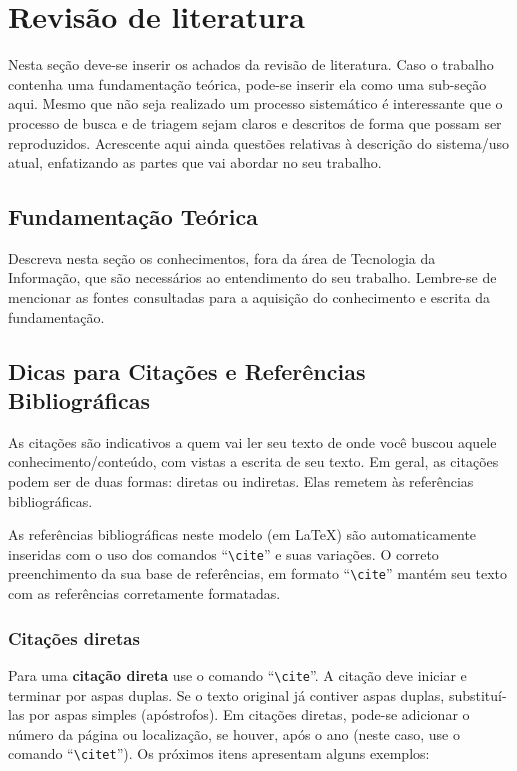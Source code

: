 \chapter{Revisão de literatura}\label{chap:revisao}

Nesta seção deve-se inserir os achados da revisão de literatura. Caso o trabalho contenha uma fundamentação teórica, pode-se inserir ela como uma sub-seção aqui. Mesmo que não seja realizado um processo sistemático é interessante que o processo de busca e de triagem sejam claros e descritos de forma que possam ser reproduzidos.  Acrescente aqui ainda questões relativas à descrição do sistema/uso atual, enfatizando as partes que vai abordar no seu trabalho.

\section{Fundamentação Teórica}

Descreva nesta seção os conhecimentos, fora da área de Tecnologia da Informação, que são necessários ao entendimento do seu trabalho. Lembre-se de mencionar as fontes consultadas para a aquisição do conhecimento e escrita da fundamentação.


\section{Dicas para Citações e Referências Bibliográficas}


As citações são indicativos a quem vai ler seu texto de onde você buscou aquele conhecimento/conteúdo, com vistas a escrita de seu texto. Em geral, as citações podem ser de duas formas: diretas ou indiretas. Elas remetem às referências bibliográficas.

As referências bibliográficas neste modelo (em \LaTeX) são automaticamente inseridas com o uso dos comandos ``\texttt{\textbackslash cite}'' e suas variações. O correto preenchimento da sua base de referências, em formato ``\texttt{\textbackslash cite}'' mantém seu texto com as referências corretamente formatadas.

\subsection{Citações diretas}

Para uma \textbf{citação direta} use o comando ``\texttt{\textbackslash cite}''. A citação deve iniciar e terminar por aspas duplas. Se o texto original já contiver aspas duplas, substituí-las por aspas simples (apóstrofos). Em citações diretas, pode-se adicionar o número da página ou localização, se houver, após o ano (neste caso, use o comando ``\texttt{\textbackslash citet}''). Os próximos itens apresentam alguns exemplos:

